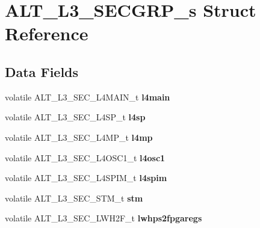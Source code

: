 \hypertarget{structALT__L3__SECGRP__s}{}\section{A\+L\+T\+\_\+\+L3\+\_\+\+S\+E\+C\+G\+R\+P\+\_\+s Struct Reference}
\label{structALT__L3__SECGRP__s}
\subsection*{Data Fields}
\begin{DoxyCompactItemize}
\item 
\mbox{\label{structALT__L3__SECGRP__s_a12025b5cc78aecebb2257d158b17d2ee}} 
volatile A\+L\+T\+\_\+\+L3\+\_\+\+S\+E\+C\+\_\+\+L4\+M\+A\+I\+N\+\_\+t {\bfseries l4main}
\item 
\mbox{\label{structALT__L3__SECGRP__s_a3ef12ac50e31b2fcd08d04ae60bde66f}} 
volatile A\+L\+T\+\_\+\+L3\+\_\+\+S\+E\+C\+\_\+\+L4\+S\+P\+\_\+t {\bfseries l4sp}
\item 
\mbox{\label{structALT__L3__SECGRP__s_aabc14fd8d60c0333081ebd10713f83ee}} 
volatile A\+L\+T\+\_\+\+L3\+\_\+\+S\+E\+C\+\_\+\+L4\+M\+P\+\_\+t {\bfseries l4mp}
\item 
\mbox{\label{structALT__L3__SECGRP__s_a442cd7e3a24649c71f5867442cd2e2a7}} 
volatile A\+L\+T\+\_\+\+L3\+\_\+\+S\+E\+C\+\_\+\+L4\+O\+S\+C1\+\_\+t {\bfseries l4osc1}
\item 
\mbox{\label{structALT__L3__SECGRP__s_a0792cd09b72454f33f29057094782899}} 
volatile A\+L\+T\+\_\+\+L3\+\_\+\+S\+E\+C\+\_\+\+L4\+S\+P\+I\+M\+\_\+t {\bfseries l4spim}
\item 
\mbox{\label{structALT__L3__SECGRP__s_aa4de4f7285fbccbfd262db8da5f9bc95}} 
volatile A\+L\+T\+\_\+\+L3\+\_\+\+S\+E\+C\+\_\+\+S\+T\+M\+\_\+t {\bfseries stm}
\item 
\mbox{\label{structALT__L3__SECGRP__s_a4fd9488c0e87f5145e4f3ba62ea442bc}} 
volatile A\+L\+T\+\_\+\+L3\+\_\+\+S\+E\+C\+\_\+\+L\+W\+H2\+F\+\_\+t {\bfseries lwhps2fpgaregs}
\item 

\end{DoxyCompactItemize}
